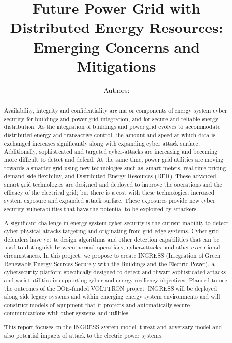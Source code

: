 \documentclass[conference]{IEEEtran}
\begin{document}
\title{Future Power Grid with Distributed Energy Resources:
Emerging Concerns and Mitigations}

 \author{ 
Authors: 


 }
\maketitle


\begin{abstract}
Availability, integrity and confidentiality are major components of energy system cyber security for buildings and power grid integration, and for secure and reliable energy distribution. As the integration of buildings and power grid evolves to accommodate distributed energy and transactive control, the amount and speed at which data is exchanged increases significantly along with expanding cyber attack surface.  Additionally, sophisticated and targeted cyber-attacks are increasing and becoming more difficult to detect and defend. At the same time, power grid utilities are moving towards a smarter grid using new technologies such as, smart meters, real-time pricing, demand side flexibility, and Distributed Energy Resources (DER). These advanced smart grid technologies are designed and deployed to improve the operations and the efficacy of the electrical grid; but there is a cost with these technologies: increased system exposure and expanded attack surface. These exposures provide new cyber security vulnerabilities that have the potential to be exploited by attackers. 

A significant challenge in energy system cyber security is the current inability to detect cyber-physical attacks targeting and originating from grid-edge systems. Cyber grid defenders have yet to design algorithms and other detection capabilities that can be used to distinguish between normal operations, cyber-attacks, and other exceptional circumstances. In this project, we propose to create  INGRESS (Integration of Green Renewable Energy Sources Securely with the Buildings and the Electric Power), a cybersecurity platform specifically designed to detect and thwart sophisticated attacks and assist utilities in supporting cyber and energy resiliency objectives. Planned to use the outcomes of the DOE-funded VOLTTRON project, INGRESS will be deployed along side legacy systems and within emerging energy system environments and will construct  models of equipment that it protects and automatically secure communications with other systems and utilities. 

This report focuses on the INGRESS system model, threat and adversary model and also potential impacts of attack to the electric power systems. 
\end{abstract}
\end{document}
